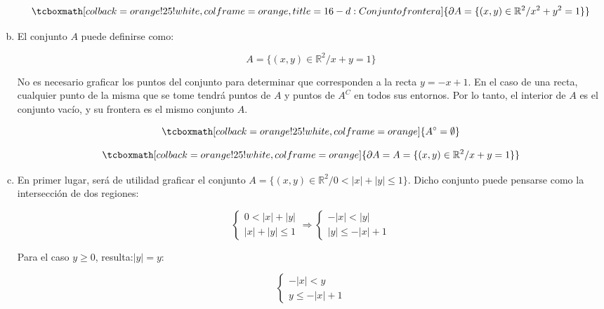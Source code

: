 \documentclass{article}
\renewcommand{\Bbb}{\mathbb}
\begin{document}
\begin{enumerate}[(a)]
\begin{equation}
\tcboxmath[colback=orange!25!white,colframe=orange, title=16-d: Conjunto frontera]
{ \partial{A} = \{ (x, y) \in \Bbb R^2 / x^2 + y^2 = 1 \} }
\end{equation}

\item El conjunto $A$ puede definirse como:

\begin{equation}
A = \{ (x, y) \in \Bbb R^2 / x + y = 1 \}
\end{equation}

No es necesario graficar los puntos del conjunto para determinar que corresponden a la recta $y = -x + 1$. En el caso de una recta, cualquier punto de la misma que se tome tendrá puntos de $A$ y puntos de $A^C$ en todos sus entornos. Por lo tanto, el interior de $A$ es el conjunto vacío, y su frontera es el mismo conjunto $A$.

\begin{equation}
\tcboxmath[colback=orange!25!white,colframe=orange]
{ A^{\circ} = \emptyset }
\end{equation}

\begin{equation}
\tcboxmath[colback=orange!25!white,colframe=orange]
{ \partial{A} = A = \{ (x, y) \in \Bbb R^2 / x + y = 1 \} }
\end{equation}

\item En primer lugar, será de utilidad graficar el conjunto $A = \{ (x,y) \in \Bbb R^2 / 0 < |x| + |y| \leq 1 \}$. Dicho conjunto puede pensarse como la intersección de dos regiones:

\begin{equation}
\left\{
\begin{array}{ll}
0 < |x| + |y| \\
|x| + |y| \leq 1
\end{array}
\right. \Rightarrow
\left\{
\begin{array}{ll}
-|x| < |y| \\
|y| \leq -|x| + 1
\end{array}
\right.
\end{equation}

Para el caso $y \geq 0$, resulta:$|y| = y$:

\begin{equation}
\left\{
\begin{array}{ll}
-|x| < y \\
y \leq -|x| + 1
\end{array}
\right.
\end{equation}


\end{enumerate}
\end{document}
